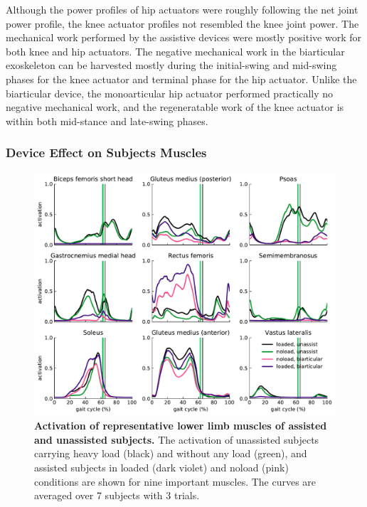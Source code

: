 \documentclass[10pt,letterpaper]{article}
\begin{document}
Although the power profiles of hip actuators were roughly following the net joint power profile, the knee actuator profiles not resembled the knee joint power. The mechanical work performed by the assistive devices were mostly positive work for both knee and hip actuators. The negative mechanical work in the biarticular exoskeleton can be harvested mostly during the initial-swing and mid-swing phases for the knee actuator and terminal phase for the hip actuator. Unlike the biarticular device, the monoarticular hip actuator performed practically no negative mechanical work, and the regeneratable work of the knee actuator is within both mid-stance and late-swing phases.
\subsubsection*{Device Effect on Subjects Muscles}
\begin{figure}[ht]   
	\centering
	\includegraphics[width=\linewidth]{Ideal_Exo_MonovsBi_Figures/PaperFigure_Biarticular_MuscleActivation.pdf}
	\vspace{1mm}
	\caption{{\small\textbf{Activation of representative lower limb muscles of assisted and unassisted subjects.} The activation of unassisted subjects carrying heavy load (black) and without any load (green), and assisted subjects in loaded (dark violet) and noload (pink) conditions are shown for nine important muscles. The curves are averaged over 7 subjects with 3 trials.}}
	\label{Fig_IdealExo_MusclesActivation}
\end{figure}
\end{document}
